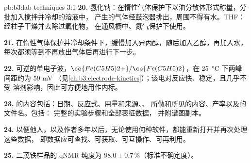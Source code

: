 \begin{solution}{pb:b3:lab-techniques-3:1}
\textbf{20.} 氢化钠：在惰性气体保护下以油分散体形式称量，分批加入搅拌并冷却的溶液中，
产生的气体经鼓泡器排出，周围不得有水。THF：经柱子干燥并去除过氧化物，
在通风橱中、氮气保护下使用。

\textbf{21.} 在惰性气体保护并冷却条件下，缓慢加入异丙醇，随后加入乙醇，再加入水，
每次都须等到不再放出气体后再进行下一步。

\textbf{22.} 可逆的单电子波，$\ce{Fe(C5H5)2+}/\ce{Fe(C5H5)2}$，在 \qty{25}{\celsius} 下两峰间距约为 59 mV
（见\cref{ch:b3:electrode-kinetics}）；该电对反应快、稳定，且几乎不受
溶剂影响，因此可方便地用作内标。

\textbf{23.} 的内容包括：日期、反应式、用量和来源、、
所做和所见的内容、产率以及的文件名。包括：
完整的实验步骤和全部表征数据，
并附谱图副本。

\textbf{24.} 以便他人，以及作者多年以后，无论使用何种软件，都能重新打开并再次处理这些数据，
即数据应可查找、可获取、可互操作、可再利用。

\textbf{25.} 二茂铁样品的 qNMR 纯度为 $98.0 \pm 0.7$\,\%（标准不确定度）。
\end{solution}
